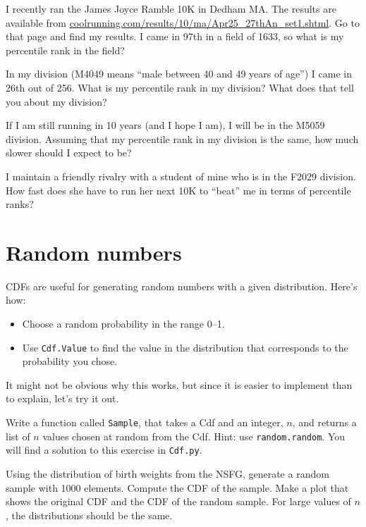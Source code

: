 \documentclass[12pt]{book}
\begin{document}
\begin{ex}


I recently ran the James Joyce Ramble 10K
in Dedham MA.  The results are available from
\url{coolrunning.com/results/10/ma/Apr25_27thAn_set1.shtml}.
Go to that page and find my results.  I came in 97th in a field
of 1633, so what is my percentile rank in the field?

In my division (M4049 means ``male between 40 and 49 years of age'')
I came in 26th out of 256.  What is my percentile rank in my division?
What does that tell you about my division?

If I am still running in 10 years (and I hope I am), I will be in
the M5059 division.  Assuming that my percentile rank in my division
is the same, how much slower should I expect to be?

I maintain a friendly rivalry with a student of mine who is in the
F2029 division.  How fast does she have to run her next 10K to
``beat'' me in terms of percentile ranks?

\end{ex}


\section{Random numbers}
\label{random}

CDFs are useful for generating random numbers with a given
distribution.  Here's how:

\begin{itemize}

\item Choose a random probability in the range 0--1.

\item Use {\tt Cdf.Value} to find the value in the distribution
that corresponds to the probability you chose.

\end{itemize}

It might not be obvious why this works, but since it is easier
to implement than to explain, let's try it out.

\begin{ex}

Write a function called {\tt Sample}, that takes a Cdf and
an integer, $n$, and returns a list of $n$ values chosen at
random from the Cdf.  Hint: use {\tt random.random}.
You will find a solution to this exercise in {\tt Cdf.py}.


Using the distribution of birth weights from the NSFG, generate a
random sample with 1000 elements.  Compute the CDF of the sample.
Make a plot that shows the original CDF and the CDF of the random
sample.  For large values of $n$, the distributions should be
the same.


\end{ex}
\end{document}
